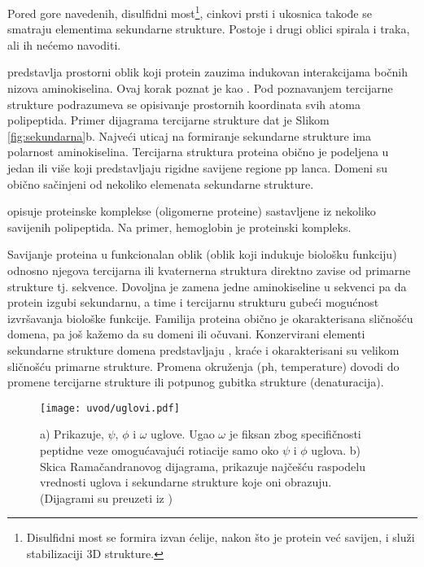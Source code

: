 Pored gore navedenih, disulfidni most\footnote{
  Disulfidni most se formira izvan ćelije, nakon što je protein  već savijen, i
  služi stabilizaciji 3D strukture.
},
cinkovi prsti i ukosnica takođe se smatraju elementima sekundarne strukture.
Postoje i drugi oblici spirala i traka, ali ih nećemo navoditi.




 predstavlja prostorni oblik koji protein zauzima
indukovan interakcijama bočnih nizova aminokiselina. Ovaj korak poznat je kao
 .  Pod poznavanjem tercijarne strukture 
podrazumeva se opisivanje prostornih koordinata svih atoma polipeptida. Primer dijagrama
tercijarne strukture dat je Slikom \ref{fig:sekundarna}b.
Najveći uticaj na formiranje sekundarne strukture ima polarnost aminokiselina.
Tercijarna struktura proteina obično je podeljena u jedan ili više
 koji predstavljaju rigidne savijene regione pp lanca.  Domeni
su obično sačinjeni od nekoliko elemenata sekundarne strukture.

 opisuje proteinske komplekse (oligomerne proteine) sastavljene
iz nekoliko savijenih polipeptida. Na primer, hemoglobin je proteinski kompleks.

Savijanje proteina u funkcionalan oblik (oblik koji indukuje biološku funkciju)
odnosno njegova tercijarna ili kvaternerna struktura direktno zavise od
primarne strukture tj. sekvence. Dovoljna je zamena jedne aminokiseline u sekvenci
pa da protein izgubi sekundarnu, a time i tercijarnu strukturu gubeći mogućnost
izvršavanja biološke funkcije. Familija proteina obično je okarakterisana
sličnošću domena, pa još kažemo da su domeni  ili očuvani.
Konzervirani elementi sekundarne strukture domena predstavljaju
, kraće  i okarakterisani su velikom
sličnošću primarne strukture. Promena okruženja (ph, temperature) dovodi do promene
tercijarne strukture ili potpunog gubitka strukture (denaturacija).


\begin{figure}[th]
\centering
\texttt{[image: uvod/uglovi.pdf]}
\caption {
  \footnotesize
  a) Prikazuje, $\psi$, $\phi$ i $\omega$ uglove. Ugao $\omega$ je fiksan
  zbog specifičnosti peptidne veze omogućavajući rotiacije samo oko
  $\psi$ i $\phi$ uglova.
  b) Skica Ramačandranovog dijagrama, prikazuje najčešću raspodelu vrednosti uglova
  i sekundarne strukture koje oni obrazuju.
  (Dijagrami su preuzeti iz \cite{Bioinformatics2007})
}
\label{fig:uglovi}
\end{figure}


